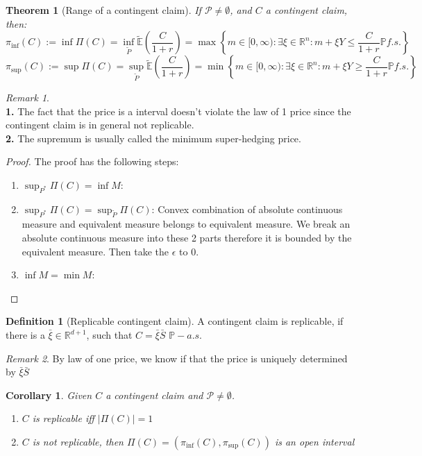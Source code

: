 \documentclass[a4paper,11pt]{book}
\newtheorem{theorem}{Theorem}[section]
\newtheorem{corollary}{Corollary}[theorem]
\theoremstyle{definition}
\newtheorem{definition}{Definition}[section]
\theoremstyle{remark}
\newtheorem*{remark}{Remark}
\begin{document}
\begin{theorem}[Range of a contingent claim]
	If $\mathcal{P} \neq \emptyset$, and $C$ a contingent claim, then:
	\begin{equation*}
		\pi_{\inf}(C):= \inf \Pi(C) = \inf_{\tilde{P}}\tilde{\mathbb{E}}(\frac{C}{1+r}) = \max \left\{ m \in [0, \infty): \exists \xi \in \mathbb{R}^n:  m +   \xi Y \leq \frac{C}{1 + r} \mathbb{P} f.s. \right\}
	\end{equation*}
	\begin{equation*}
		\pi_{\sup}(C) := \sup \Pi(C) = \sup_{\tilde{P}}\tilde{\mathbb{E}}(\frac{C}{1+r}) = \min \left\{ m \in [0, \infty) : \exists \xi \in \mathbb{R}^n: m + \xi Y \geq \frac{C}{1 + r} \mathbb{P} f.s. \right\} 
	\end{equation*}
\end{theorem}
\begin{remark}\quad\\
\textbf{1.} The fact that the price is a interval doesn't violate the law of 1 price since the contingent claim is in general not replicable. \\
\textbf{2. }The supremum is usually called the minimum super-hedging price. 	
\end{remark}
\begin{proof}
	The proof has the following steps:
	\begin{enumerate}
		\item $\sup_{P^*}\Pi(C) = \inf M$:
		\item $\sup_{P^*}\Pi(C) = \sup_{\tilde{P}}\Pi(C)$: Convex combination of absolute continuous measure and equivalent measure belongs to equivalent measure. We break an absolute continuous measure into these 2 parts therefore it is bounded by the equivalent measure. Then take the $\epsilon$ to 0.  
		\item $\inf M = \min M$:
	\end{enumerate}
\end{proof}

\begin{definition}[Replicable contingent claim]
A contingent claim is replicable, if there is a $\bar{\xi} \in \mathbb{R}^{d+1}$, such that $C = \bar{\xi} \bar{S}$ $\mathbb{P}-a.s.$
\end{definition}
\begin{remark}
By law of one price, we know if that the price is uniquely determined by $\bar{\xi} \bar{S}$	
\end{remark}

\begin{corollary}
	Given $C$ a contingent claim and $\mathcal{P} \neq \emptyset$.
	\begin{enumerate}
		\item $C$ is replicable iff $|\Pi(C)| = 1$
		\item $C$ is not replicable, then $\Pi(C) = (\pi_{\inf}(C), \pi_{\sup}(C))$ is an open interval
	\end{enumerate}
\end{corollary}
\end{document}
